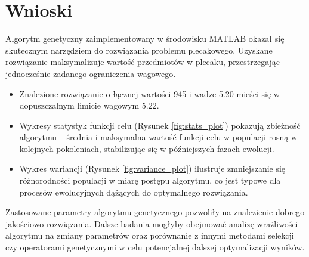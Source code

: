 \documentclass[a4paper, 11pt]{article}
\begin{document}
\section{Wnioski}
Algorytm genetyczny zaimplementowany w środowisku MATLAB okazał się skutecznym narzędziem do rozwiązania problemu plecakowego. Uzyskane rozwiązanie maksymalizuje wartość przedmiotów w plecaku, przestrzegając jednocześnie zadanego ograniczenia wagowego.
\begin{itemize}
    \item Znalezione rozwiązanie o łącznej wartości 945 i wadze 5.20 mieści się w dopuszczalnym limicie wagowym 5.22.
    \item Wykresy statystyk funkcji celu (Rysunek \ref{fig:stats_plot}) pokazują zbieżność algorytmu – średnia i maksymalna wartość funkcji celu w populacji rosną w kolejnych pokoleniach, stabilizując się w późniejszych fazach ewolucji.
    \item Wykres wariancji (Rysunek \ref{fig:variance_plot}) ilustruje zmniejszanie się różnorodności populacji w miarę postępu algorytmu, co jest typowe dla procesów ewolucyjnych dążących do optymalnego rozwiązania.
\end{itemize}
Zastosowane parametry algorytmu genetycznego pozwoliły na znalezienie dobrego jakościowo rozwiązania. Dalsze badania mogłyby obejmować analizę wrażliwości algorytmu na zmiany parametrów oraz porównanie z innymi metodami selekcji czy operatorami genetycznymi w celu potencjalnej dalszej optymalizacji wyników.
\end{document}
